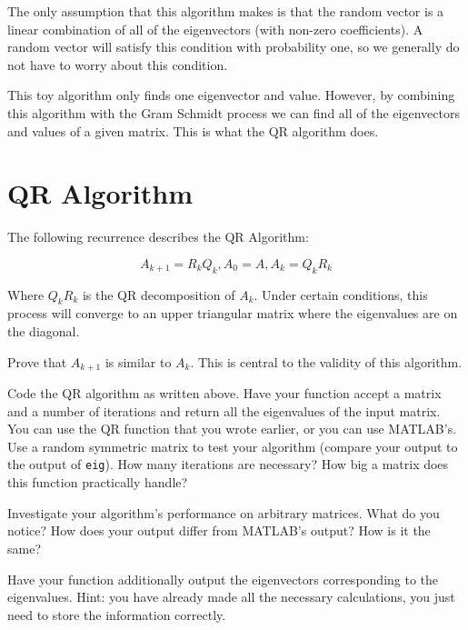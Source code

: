 The only assumption that this algorithm makes is that the random vector is a linear combination of all of the eigenvectors (with non-zero coefficients). A random vector will satisfy this condition with probability one, so we generally do not have to worry about this condition. 

This toy algorithm only finds one eigenvector and value. However, by combining this algorithm with the Gram Schmidt process we can find all of the eigenvectors and values of a given matrix. This is what the QR algorithm does.

\section*{QR Algorithm}

The following recurrence describes the QR Algorithm:

\[
A_{k+1} = R_k Q_k, A_0 = A, A_k = Q_k R_k
\]

Where $Q_kR_k$ is the QR decomposition of $A_k$. Under certain conditions, this process will converge to an upper triangular matrix where the eigenvalues are on the diagonal.

\begin{problem}
Prove that $A_{k+1}$ is similar to $A_k$. This is central to the validity of this algorithm.
\end{problem}

\begin{matlab}
\begin{problem}
Code the QR algorithm as written above. Have your function accept a matrix and a number of iterations and return all the eigenvalues of the input matrix. You can use the QR function that you wrote earlier, or you can use MATLAB's. Use a random symmetric matrix to test your algorithm (compare your output to the output of {\tt eig}). How many iterations are necessary? How big a matrix does this function practically handle?
\end{problem}

\begin{problem}
Investigate your algorithm's performance on arbitrary matrices. What do you notice? How does your output differ from MATLAB's output? How is it the same?
\end{problem}
\end{matlab}

\begin{problem}
Have your function additionally output the eigenvectors corresponding to the eigenvalues. Hint: you have already made all the necessary calculations, you just need to store the information correctly.
\end{problem}

